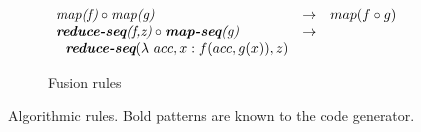 \begin{figure}[t]
\vspace{-0.5em}
\begin{subfigure}[b]{1\linewidth}
\begin{mdframed}
$$
\begin{array}{lll}
\textit{map(f)} \circ \textit{map(g)}                                & \rightarrow & map(f \circ g)\\
\textit{\textbf{reduce-seq}(f,z)} \circ \textit{\textbf{map-seq}(g)} & \rightarrow & \\
{\ \ } \textit{\textbf{reduce-seq}}(\lambda\ acc,x: f(acc,g(x)), z)\\
\end{array}
$$
\end{mdframed}
  \caption{Fusion rules}
   \label{fig:algo:fusion}
\end{subfigure}
\vspace{-2em}
\caption{Algorithmic rules. Bold patterns are known to the code generator.}
\label{fig:algo}
\end{figure}

